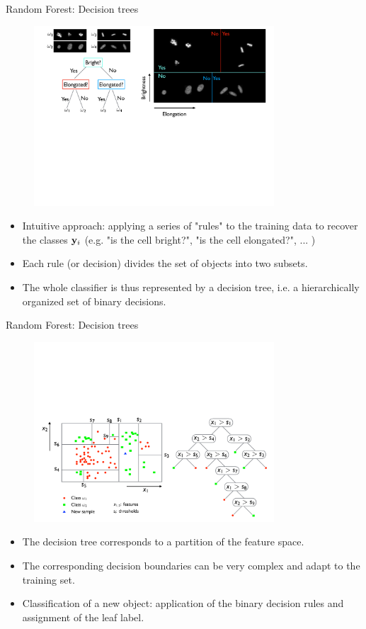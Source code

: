 \documentclass[xcolor=pdftex,dvipsnames,table]{beamer}
\begin{document}
\begin{frame}{Random Forest: Decision trees}
\begin{figure}[htb]
\includegraphics[width=0.8\textwidth]{../graphics/CellClassification_RF.pdf}
\end{figure}

\begin{itemize}
	\item Intuitive approach: applying a series of "rules" to the training data to recover the classes $\mathbf{y}_i$ (e.g. "is the cell bright?", "is the cell elongated?", ... )
	\item Each rule (or decision) divides the set of objects into two subsets.
	\item The whole classifier is thus represented by a decision tree, i.e. a hierarchically organized set of binary decisions.
\end{itemize}
\end{frame}

\begin{frame}{Random Forest: Decision trees}
\begin{figure}[htb]
\includegraphics[width=0.8\textwidth]{../graphics/RF2.pdf}
\end{figure}
\begin{itemize}
	\item The decision tree corresponds to a partition of the feature space.
	\item The corresponding decision boundaries can be very complex and adapt to the training set.
	\item Classification of a new object: application of the binary decision rules and assignment of the leaf label.
\end{itemize}
\end{frame}
\end{document}
